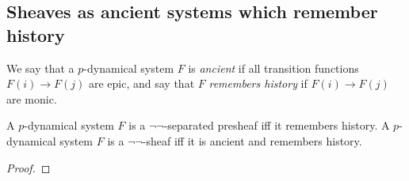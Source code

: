 \documentclass{amsart}
\begin{document}
\subsection{Sheaves as ancient systems which remember history}
We say that a $p$-dynamical system $F$ is \emph{ancient} if all transition functions $F(i) \rightarrow F(j)$ are epic, and say that $F$ \emph{remembers history} if $F(i) \rightarrow F(j)$ are monic.
\begin{proposition}
  A $p$-dynamical system $F$ is a $\neg\neg$-separated presheaf iff it remembers history.
  A $p$-dynamical system $F$ is a $\neg\neg$-sheaf iff it is ancient and remembers history.
\end{proposition}
\begin{proof}
\end{proof}
\end{document}
